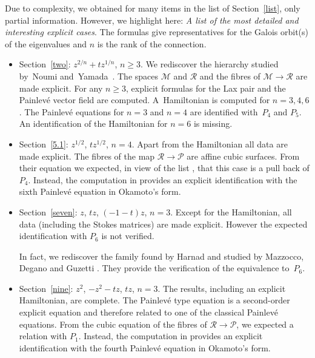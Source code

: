 \documentclass[pdftex]{sigma}
\numberwithin{equation}{section}
\begin{document}
Due to complexity, we obtained for many items in the list of Section~\ref{list}, only partial information. However,
we highlight here:
 {\it A list of the most detailed and interesting explicit cases}.
 The formulas give representatives for the Galois orbit(s) of the eigenvalues and $n$ is the rank of the connection.
 \begin{itemize}\itemsep=0pt
\item Section~\ref{two}: $z^{2/n}+tz^{1/n}$, $n\geq 3$. We rediscover the hierarchy studied by~Noumi and~Yamada~\cite{N-Y}.
The spaces $\mathcal{M}$ and $\mathcal{R}$ and the fibres of $\mathcal{M}\rightarrow \mathcal{R}$ are made explicit.
For any $n\geq 3$, explicit formulas for the Lax pair and the Painlev\'e vector field are computed.
A~Hamiltonian is computed for $n=3,4,6$. The Painlev\'e equations for $n=3$ and $n=4$ are identified with~$P_4$ and $P_5$. An identification of the Hamiltonian for $n=6$ is missing.

\item Section~\ref{5.1}: $z^{1/2}$, $tz^{1/2}$, $n=4$.
Apart from the Hamiltonian all data are made explicit. The fibres of the map $\mathcal{R}\rightarrow \mathcal{P}$ are
affine cubic surfaces. From their equation we expected, in view of the list \cite[pp.~26--27]{vdP-Sa}, that this case is a
 pull back of $P_4$. Instead,
 the computation in \cite[Section~1]{Dz} provides an explicit identification with the sixth Painlev\'e equation in Okamoto's form.

\item Section~\ref{seven}: $z$, $tz$, $(-1-t)z$, $n=3$. Except for the Hamiltonian, all data (including the Stokes matrices) are made explicit. However the expected identification with $P_6$ is not verified.

In fact, we rediscover the family found by
Harnad and studied by Mazzocco, Degano and Guzetti \cite{D-G,H,Maz}. They provide the verification
of the equivalence to~$P_6$.

\item Section~\ref{nine}: $z^2$, $-z^2-tz$, $tz$, $n=3$. The results, including an explicit Hamiltonian, are complete. The
Painlev\'e type equation is a second-order explicit equation and therefore related to one of the classical Painlev\'e
equations. From the cubic equation of the fibres of $\mathcal{R}\rightarrow \mathcal{P}$, we expected a relation
with $P_1$. Instead, the computation in \cite[Section~2]{Dz} provides an explicit identification with the fourth Painlev\'e equation in Okamoto's form.


\end{itemize}
\end{document}
